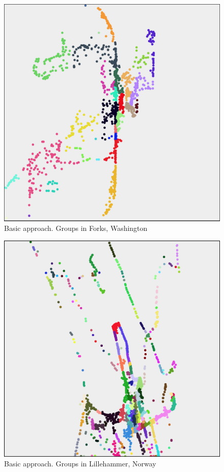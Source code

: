 \begin{figure}[H]
	\center
	\includegraphics[scale=0.34]{Images/computations/BASICForks.jpg}
	\caption{Basic approach. Groups in Forks, Washington}
	\label{fig:basic_forks}
\end{figure}

\begin{figure}[H]
	\center
	\includegraphics[scale=0.34]{Images/computations/BASICLillehammer.jpg}
	\caption{Basic approach. Groups in Lillehammer, Norway}
	\label{fig:basic_lillehammer}
\end{figure}

